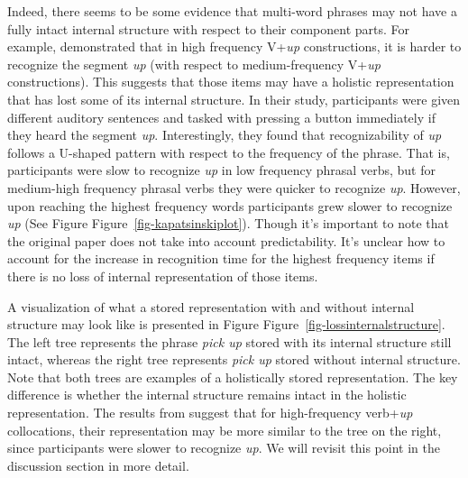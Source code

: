 \documentclass[
  authoryear,
  preprint,
  1p,
  onecolumn]{elsarticle}
\begin{document}
Indeed, there seems to be some evidence that multi-word phrases may not
have a fully intact internal structure with respect to their component
parts. For example, \citet{kapatsinski2009} demonstrated that in high
frequency V+\emph{up} constructions, it is harder to recognize the
segment \emph{up} (with respect to medium-frequency V+\emph{up}
constructions). This suggests that those items may have a holistic
representation that has lost some of its internal structure. In their
study, participants were given different auditory sentences and tasked
with pressing a button immediately if they heard the segment \emph{up}.
Interestingly, they found that recognizability of \emph{up} follows a
U-shaped pattern with respect to the frequency of the phrase. That is,
participants were slow to recognize \emph{up} in low frequency phrasal
verbs, but for medium-high frequency phrasal verbs they were quicker to
recognize \emph{up}. However, upon reaching the highest frequency words
participants grew slower to recognize \emph{up} (See Figure
Figure~\ref{fig-kapatsinskiplot}). Though it's important to note that
the original paper does not take into account predictability. It's
unclear how to account for the increase in recognition time for the
highest frequency items if there is no loss of internal representation
of those items.

A visualization of what a stored representation with and without
internal structure may look like is presented in Figure
Figure~\ref{fig-lossinternalstructure}. The left tree represents the
phrase \emph{pick up} stored with its internal structure still intact,
whereas the right tree represents \emph{pick up} stored without internal
structure. Note that both trees are examples of a holistically stored
representation. The key difference is whether the internal structure
remains intact in the holistic representation. The results from
\citet{kapatsinski2009} suggest that for high-frequency verb+\emph{up}
collocations, their representation may be more similar to the tree on
the right, since participants were slower to recognize \emph{up}. We
will revisit this point in the discussion section in more detail.
\end{document}
